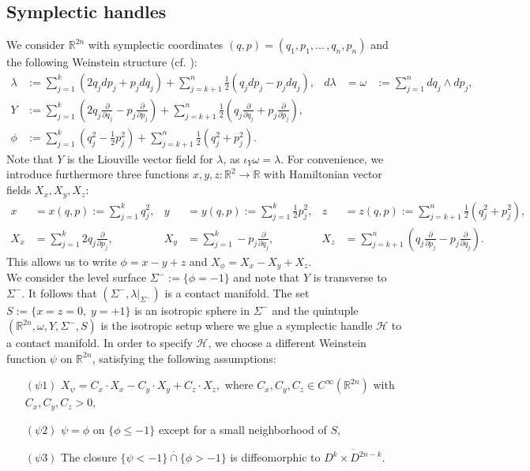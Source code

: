 \documentclass[a4paper,12pt,bibliography=totocnumbered,titlepage=false,abstracton,bookmarksnumbered=true]{scrartcl}
\theoremstyle{definition}
\begin{document}
\subsection{Symplectic handles}\label{handle}
We consider $\mathbb{R}^{2n}$ with symplectic coordinates $(q,p)=(q_1,p_1,...\,,q_n,p_n)$ and the following Weinstein structure (cf. \cite{Wein}):
\begin{align*}
\lambda &:= \sum_{j=1}^k\left(2q_jdp_j + p_jdq_j\right)+\sum_{j=k+1}^n\frac{1}{2}\left(q_jdp_j -p_jdq_j\right),& d\lambda &= \omega &:= \sum_{j=1}^n dq_j\wedge dp_j,\\
 Y &:= \sum_{j=1}^k \left(2q_j\frac{\partial}{\partial q_j} - p_j\frac{\partial}{\partial p_j}\right) + \sum_{j=k+1}^n \frac{1}{2}\left(q_j\frac{\partial}{\partial q_j} + p_j\frac{\partial}{\partial p_j}\right),\\
  \phi&:=\sum_{j=1}^k\left( q_j^2-\frac{1}{2}p_j^2\right) + \sum_{j=k+1}^n \frac{1}{2}\left(q_j^2+p_j^2\right).
\end{align*}
Note that $Y$ is the Liouville vector field for $\lambda$, as $\iota_Y\omega = \lambda$. For convenience, we introduce furthermore three functions $x,y,z:\mathbb{R}^2\rightarrow\mathbb{R}$ with Hamiltonian vector fields $X_x, X_y, X_z$:
\begin{align*}
 x&=x(q,p):= \sum_{j=1}^k q_j^2, & y&=y(q,p):= \sum_{j=1}^k \frac{1}{2} p_j^2, & z&=z(q,p):= \sum_{j=k+1}^n \frac{1}{2}\left( q_j^2+p_j^2\right),\\
 X_x &= \sum_{j=1}^k 2q_j\frac{\partial}{\partial p_j},&
 X_y &= \sum_{j=1}^k -p_j\frac{\partial}{\partial q_j},&
 X_z &= \sum_{j=k+1}^n \left(q_j\frac{\partial}{\partial p_j} - p_j\frac{\partial}{\partial q_j}\right).
\end{align*}
This allows us to write $\phi=x-y+z$ and $X_\phi=X_x-X_y+X_z$.\\
We consider the level surface $\Sigma^- :=\{\phi=-1\}$ and note that $Y$ is transverse to $\Sigma^-$. It follows that $(\Sigma^-,\lambda|_{\Sigma^-})$ is a contact manifold. The set $S:=\{x{=}z{=}0,\;y{=}{+}1\}$ is an isotropic sphere in $\Sigma^-$ and the quintuple $(\mathbb{R}^{2n},\omega,Y,\Sigma^-,S)$ is the isotropic setup where we glue a symplectic handle $\mathcal{H}$ to a contact manifold. In order to specify $\mathcal{H}$, we choose a different Weinstein function $\psi$ on $\mathbb{R}^{2n}$, satisfying the following assumptions:
\begin{itemize}
 \item[$(\psi 1)$] $X_\psi=C_x{\cdot} X_x-C_y{\cdot} X_y+C_z{\cdot} X_z,$ where $C_x,C_y,C_z\in C^\infty(\mathbb{R}^{2n})$ with $C_x,C_y,C_z> 0$,
 \item[$(\psi 2)$] $\psi=\phi$ on $\{\phi\leq -1\}$ except for a small neighborhood of $S$,
 \item[$(\psi 3)$] The closure $\overline{\{\psi{<} {-}1\}\cap\{\phi{>} {-}1\}}$ is diffeomorphic to $\overline{D^k{\times} D^{2n-k}}$.
\end{itemize}
\end{document}
